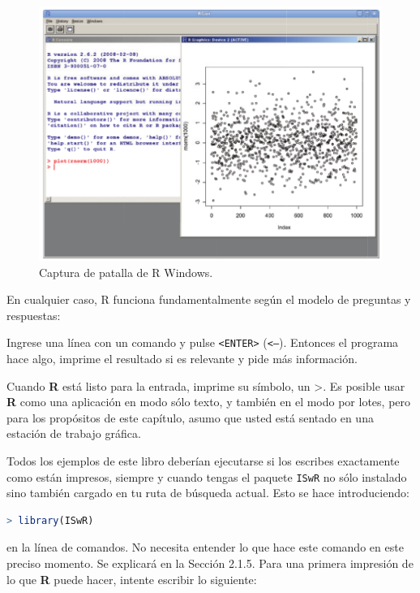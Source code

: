 \documentclass[spanish]{extbook}
\numberwithin{equation}{section}
\numberwithin{figure}{section}
\begin{document}
\begin{figure}[H]
  \includegraphics[width=\linewidth]{fig-1.png}
  \caption{Captura de patalla de R Windows.}
  \label{fig:fig-1}
\end{figure}

En cualquier caso, R funciona fundamentalmente según el modelo de
preguntas y respuestas:

Ingrese una línea con un comando y pulse \texttt{<ENTER>} (\texttt{<--}).
Entonces el programa hace algo, imprime el resultado si es relevante y pide más
información.

Cuando \textbf{R} está listo para la entrada, imprime su símbolo, un
\textquotedbl{}>\textquotedbl{}.  Es posible usar \textbf{R} como una
aplicación en modo sólo texto, y también en el modo por lotes, pero para los
propósitos de este capítulo, asumo que usted está sentado en una estación de
trabajo gráfica.

Todos los ejemplos de este libro deberían ejecutarse si los escribes
exactamente como están impresos, siempre y cuando tengas el paquete
\texttt{ISwR} no sólo instalado sino también cargado en tu ruta de búsqueda
actual. Esto se hace introduciendo:
\newpage

\begin{lstlisting}[language=R]
> library(ISwR)
\end{lstlisting}

en la línea de comandos. No necesita entender lo que hace este comando en este
preciso momento. Se explicará en la Sección 2.1.5. Para una primera impresión de
lo que \textbf{R} puede hacer, intente escribir lo siguiente:
\end{document}

